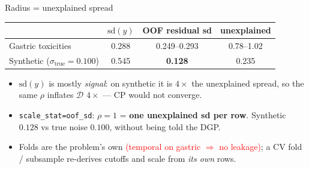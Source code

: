 \documentclass{beamer}
\newcommand{\mc}[1]{\textcolor{red}{#1}}
\begin{document}
\begin{frame}{Radius = unexplained spread}
  \begin{center}\small
  \begin{tabular}{@{}lccc@{}}
    \toprule
    & $\mathrm{sd}(y)$ & OOF residual sd & unexplained \\
    \midrule
    Gastric toxicities & 0.288 & 0.249--0.293 & 0.78--1.02 \\
    Synthetic ($\sigma_{\text{true}}=0.100$) & 0.545 & \textbf{0.128} & 0.235 \\
    \bottomrule
  \end{tabular}
  \end{center}
  \medskip
  \begin{itemize}
    \item $\mathrm{sd}(y)$ is mostly \emph{signal}: on synthetic it is $4\times$ the
      unexplained spread, so the same $\rho$ inflates $\mathcal D$ $4\times$ ---
      CP would not converge.
    \item \texttt{scale\_stat=oof\_sd}: $\rho=1$ = \textbf{one unexplained sd per row}.
      Synthetic $0.128$ vs true noise $0.100$, without being told the DGP.
    \item Folds are the problem's own \mc{(temporal on gastric $\Rightarrow$ no
      leakage)}; a CV fold / subsample re-derives cutoffs and scale from
      \emph{its own} rows.
  \end{itemize}
\end{frame}
\end{document}
